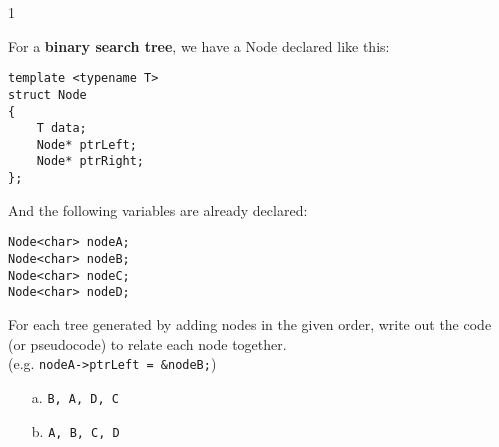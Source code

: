 \documentclass[a4paper,12pt,oneside]{book}
\newcounter{question}
\begin{document}
\notonkey{ \newpage }{ \hrulefill }


        \begin{question}{\thequestion}{1}

            For a \textbf{binary search tree}, we have a Node declared like this:
                    
\footnotesize 
\begin{verbatim}
template <typename T>
struct Node
{
    T data;
    Node* ptrLeft;
    Node* ptrRight;
};
\end{verbatim}
\normalsize

            And the following variables are already declared:

\begin{verbatim}
Node<char> nodeA;
Node<char> nodeB;
Node<char> nodeC;
Node<char> nodeD;
\end{verbatim}

            For each tree generated by adding nodes in the given order,
            write out the
            code (or pseudocode) to relate each node together. \\
            (e.g. \texttt{nodeA->ptrLeft = \&nodeB;})

            
            \begin{itemize}
                \item[a.]   \texttt{B, A, D, C}
                    
                \item[b.]   \texttt{A, B, C, D}
\end{itemize}
\end{question}
\end{document}
